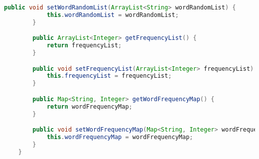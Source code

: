 \documentclass[a4paper]{article}
\begin{document}
\begin{lstlisting}[language={java}]
        public void setWordRandomList(ArrayList<String> wordRandomList) {
            this.wordRandomList = wordRandomList;
        }

        public ArrayList<Integer> getFrequencyList() {
            return frequencyList;
        }

        public void setFrequencyList(ArrayList<Integer> frequencyList) {
            this.frequencyList = frequencyList;
        }

        public Map<String, Integer> getWordFrequencyMap() {
            return wordFrequencyMap;
        }

        public void setWordFrequencyMap(Map<String, Integer> wordFrequencyMap) {
            this.wordFrequencyMap = wordFrequencyMap;
        }
    }
\end{lstlisting}
\end{document}
